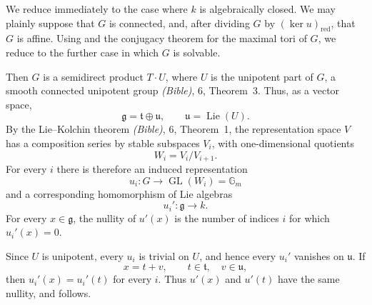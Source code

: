 We reduce immediately to the case where \(k\) is algebraically
closed. We may plainly suppose that \(G\) is connected, and, after
dividing \(G\) by \((\ker u)_{\mathrm{red}}\), that \(G\) is
affine. Using  and the conjugacy theorem for the maximal tori
of \(G\), we reduce to the further case in which \(G\) is solvable.

Then \(G\) is a semidirect product \(T\cdot U\), where \(U\) is the
unipotent part of \(G\), a smooth connected unipotent group
\textup{\emph{(Bible)}, 6, Theorem~3}. Thus, as a vector space,
\[
  \mathfrak g=\mathfrak t\oplus\mathfrak u,
  \qquad
  \mathfrak u=\operatorname{Lie}(U).
\]
By the Lie--Kolchin theorem
\textup{\emph{(Bible)}, 6, Theorem~1}, the representation space
\(V\) has a composition series by stable subspaces \(V_i\), with
one-dimensional quotients
\[
  W_i=V_i/V_{i+1}.
\]
For every \(i\) there is therefore an induced representation
\[
  u_i\colon G\longrightarrow
  \operatorname{GL}(W_i)=\mathbb G_m
\]
and a corresponding homomorphism of Lie algebras
\[
  u_i'\colon\mathfrak g\longrightarrow k.
\]
For every \(x\in\mathfrak g\), the nullity of \(u'(x)\) is the
number of indices \(i\) for which \(u_i'(x)=0\).

Since \(U\) is unipotent, every \(u_i\) is trivial on \(U\), and
hence every \(u_i'\) vanishes on \(\mathfrak u\). If
\[
  x=t+v,\qquad t\in\mathfrak t,\quad v\in\mathfrak u,
\]
then \(u_i'(x)=u_i'(t)\) for every \(i\). Thus \(u'(x)\) and
\(u'(t)\) have the same nullity, and  follows.

